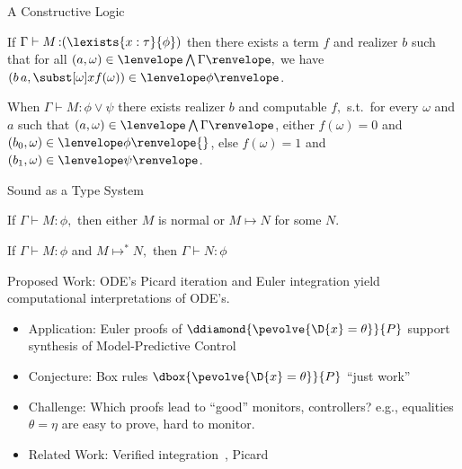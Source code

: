 \documentclass[slidestop,aspectratio=169]{beamer}
\newcommand{\fint}[2]{#2\lenvelope#1\renvelope}
\newcommand{\om}{\omega}
\newcommand{\stepsto}{\allowbreak\mapsto\allowbreak}
\newcommand{\stt}{\textsf{early\_win}}
\newcommand{\ssub}[3]{\subst[{#1}]{#2}{#3}}
\newcommand{\rzFst}[1]{#1_0}
\newcommand{\rzSnd}[1]{#1_1}
\newcommand{\rzApp}[2]{#1\,#2}
\renewcommand{\aa}{a}
\newcommand{\ab}{b}
\newcommand{\fintR}[1]{\fint{#1}{}} %
\newcommand*{\strategyforR}[2][]{{#2}\Langle{#1}\Rangle}
\newcommand{\cintR}[1]{\fintR{\bigwedge #1}}
\newcommand{\proves}[3]{#1\allowbreak\vdash #2 \allowbreak \mathop{:} #3}
\newcommand{\G}{\Gamma}
\theoremstyle{plain}
\theoremstyle{definition}
\theoremstyle{remark}
\begin{document}
\begin{frame}[t]{A Constructive Logic}
\begin{lemma}
If $\proves{\Gamma}{M}{(\lexists{x:\tau}{\phi})}$ then there exists a term $f$ and realizer $\ab$ such that for all $(\aa,\om) \in \cintR{\G},$
we have $(\rzApp{\ab}{\aa},\ssub{\om}{x}{f(\om)}) \in \fintR{\phi}$.
\label{lem:term-ep}
\end{lemma}
\begin{lemma}
When $\proves{\Gamma}{M}{\phi \lor \psi}$ there exists realizer $\ab$ and computable $f,$ s.t.\ for every $\om$ and $\aa$ such that $(\aa,\omega) \in \cintR{\G}$, either $f(\omega)=0$ and $(\rzFst{\ab},\omega) \in \fintR{\phi}{}$, else $f(\omega)=1$ and $(\rzSnd{\ab},\omega) \in \fintR{\psi}$.
\end{lemma}
\end{frame}

\begin{frame}[t]{Sound as a Type System}
\begin{lemma}[Progress]
If $\proves{\Gamma}{M}{\phi},$ then either $M$ is normal or $M \stepsto N$ for some $N$.
\end{lemma}
\begin{lemma}[Preservation]
If $\proves{\Gamma}{M}{\phi}$ and $M \stepsto^* N,$ then $\proves{\Gamma}{N}{\phi}$
\end{lemma}
\end{frame}

\begin{frame}[t]{Proposed Work: ODE's}
Picard iteration and Euler integration yield computational interpretations of ODE's.
\begin{itemize}
  \item Application: Euler proofs of $\ddiamond{\pevolve{\D{x}=\theta}}{P}$ support synthesis of Model-Predictive Control
  \item Conjecture: Box rules $\dbox{\pevolve{\D{x}=\theta}}{P}$ ``just work''
  \item Challenge: Which proofs lead to ``good'' monitors, controllers?
     e.g., equalities $\theta = \eta$ are easy to prove, hard to monitor.
  \item Related Work: Verified integration~\cite{DBLP:conf/itp/ImmlerT16}, Picard~\cite{DBLP:conf/itp/MakarovS13}
\end{itemize}
\end{frame}
\end{document}
